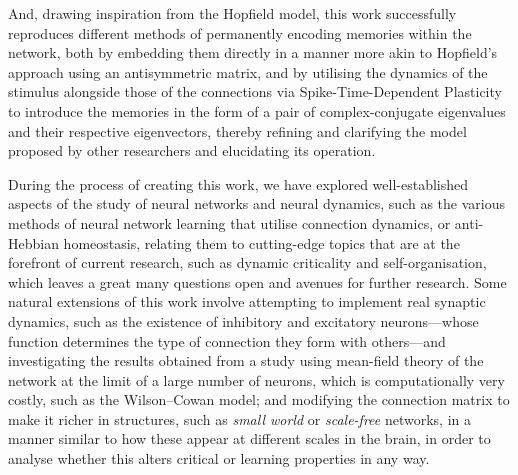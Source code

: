 \documentclass[11pt,a4paper,twoside,pdf]{article}
\numberwithin{equation}{section}
\begin{document}
And, drawing inspiration from the Hopfield model, this work successfully reproduces different methods of permanently encoding memories within the network, both by embedding them directly in a manner more akin to Hopfield’s approach using an antisymmetric matrix, and by utilising the dynamics of the stimulus alongside those of the connections via Spike-Time-Dependent Plasticity to introduce the memories in the form of a pair of complex-conjugate eigenvalues and their respective eigenvectors, thereby refining and clarifying the model proposed by other researchers and elucidating its operation.

During the process of creating this work, we have explored well-established aspects of the study of neural networks and neural dynamics, such as the various methods of neural network learning that utilise connection dynamics, or anti-Hebbian homeostasis, relating them to cutting-edge topics that are at the forefront of current research, such as dynamic criticality and self-organisation, which leaves a great many questions open and avenues for further research. Some natural extensions of this work involve attempting to implement real synaptic dynamics, such as the existence of inhibitory and excitatory neurons—whose function determines the type of connection they form with others—and investigating the results obtained from a study using mean-field theory of the network at the limit of a large number of neurons, which is computationally very costly, such as the Wilson–Cowan model; and modifying the connection matrix to make it richer in structures, such as \emph{small world} or \emph{scale-free} networks, in a manner similar to how these appear at different scales in the brain, in order to analyse whether this alters critical or learning properties in any way.

\printbibliography
\end{document}
